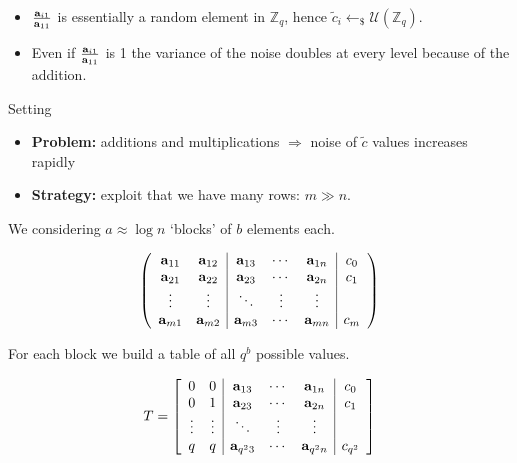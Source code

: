 \documentclass[10pt]{beamer}
\newcommand{\U}[1]{\ensuremath{\mathcal{U}(#1)\xspace}}
\newcommand{\Z}{\ensuremath{\mathbb{Z}}\xspace}
\newcommand{\sample}{\ensuremath{\leftarrow_{\$}}}
\begin{document}
\begin{frame}[allowframebreaks]
\framebreak

\begin{itemize}
 \item $\frac{\bold{a}_{i1}}{\bold{a}_{11}}$ is essentially a random element in $\Z_q$, hence $\tilde c_i \sample \U{\Z_q}$.
 \item Even if $\frac{\bold{a}_{i1}}{\bold{a}_{11}}$ is 1 the variance of the noise doubles at every level because of the addition.  
\end{itemize}

\vspace{1em}

\begin{block}{Setting}
\begin{itemize}
 \item \textbf{Problem:} additions and multiplications $\Rightarrow$ noise of $\tilde{c}$ values increases rapidly
 \item \textbf{Strategy:} exploit that we have many rows: $m \gg n$.
\end{itemize}
\end{block} 

\framebreak

We considering $a \approx \log n$ `blocks' of $b$ elements each.

\begin{equation*}
\left(
\begin{array}{cc|ccc|c}
\bold{a}_{11} & \bold{a}_{12} & \bold{a}_{13} & \cdots & \bold{a}_{1n} & c_0\\
\bold{a}_{21} & \bold{a}_{22} & \bold{a}_{23} & \cdots & \bold{a}_{2n} & c_1\\
\vdots & \vdots & \ddots & \vdots & \vdots\\
\bold{a}_{m1} & \bold{a}_{m2} & \bold{a}_{m3} & \cdots & \bold{a}_{mn} & c_{m}
\end{array}
\right)
\end{equation*}

\framebreak

For each block we build a table of all $q^b$ possible values.

\begin{equation*}
T = \left[ 
\begin{array}{cc|ccc|c}
0 & 0 & \bold{a}_{13} & \cdots & \bold{a}_{1n} & c_0\\
0 & 1 & \bold{a}_{23} & \cdots & \bold{a}_{2n} & c_1\\
\vdots & \vdots & \ddots & \vdots & \vdots\\
q & q & \bold{a}_{q^23} & \cdots & \bold{a}_{q^2n} & c_{q^2}
\end{array}\right]
\end{equation*}


\end{frame}
\end{document}
